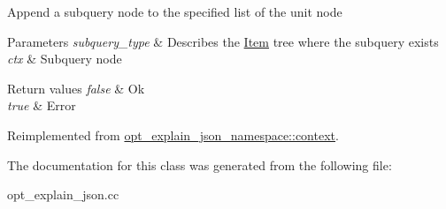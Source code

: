 Append a subquery node to the specified list of the unit node


\begin{DoxyParams}{Parameters}
{\em subquery\+\_\+type} & Describes the \mbox{\hyperlink{classItem}{Item}} tree where the subquery exists \\
\hline
{\em ctx} & Subquery node\\
\hline
\end{DoxyParams}

\begin{DoxyRetVals}{Return values}
{\em false} & Ok \\
\hline
{\em true} & Error \\
\hline
\end{DoxyRetVals}


Reimplemented from \mbox{\hyperlink{classopt__explain__json__namespace_1_1context_ad9df2d2b16093c51e1c5557227b2fd56}{opt\+\_\+explain\+\_\+json\+\_\+namespace\+::context}}.



The documentation for this class was generated from the following file\+:\begin{DoxyCompactItemize}
\item 
opt\+\_\+explain\+\_\+json.\+cc\end{DoxyCompactItemize}
